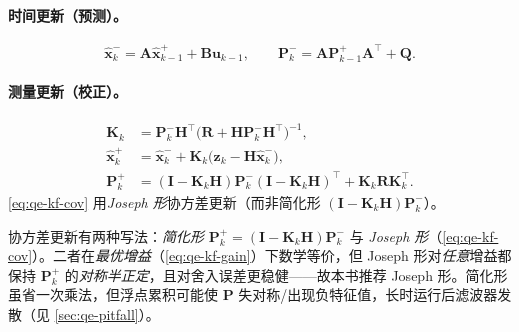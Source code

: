 \paragraph{时间更新（预测）。}
\begin{equation}
  \hat{\boldsymbol x}_k^- = \mathbf{A}\hat{\boldsymbol x}_{k-1}^+ + \mathbf{B}\boldsymbol u_{k-1},
  \qquad
  \mathbf{P}_k^- = \mathbf{A}\mathbf{P}_{k-1}^+\mathbf{A}^\top + \mathbf{Q}.
  \label{eq:qe-kf-predict}
\end{equation}

\paragraph{测量更新（校正）。}
\begin{align}
  \mathbf{K}_k &= \mathbf{P}_k^-\mathbf{H}^\top\big(\mathbf{R} + \mathbf{H}\mathbf{P}_k^-\mathbf{H}^\top\big)^{-1},
  \label{eq:qe-kf-gain}\\
  \hat{\boldsymbol x}_k^+ &= \hat{\boldsymbol x}_k^- + \mathbf{K}_k\big(\boldsymbol z_k - \mathbf{H}\hat{\boldsymbol x}_k^-\big),
  \label{eq:qe-kf-update}\\
  \mathbf{P}_k^+ &= (\mathbf{I} - \mathbf{K}_k\mathbf{H})\mathbf{P}_k^-(\mathbf{I} - \mathbf{K}_k\mathbf{H})^\top + \mathbf{K}_k\mathbf{R}\mathbf{K}_k^\top.
  \label{eq:qe-kf-cov}
\end{align}
\cref{eq:qe-kf-cov} 用\emph{Joseph 形}协方差更新（而非简化形 $(\mathbf{I}-\mathbf{K}_k\mathbf{H})\mathbf{P}_k^-$）。

\begin{note}\label{note:qe-joseph}
协方差更新有两种写法：\emph{简化形} $\mathbf{P}_k^+=(\mathbf{I}-\mathbf{K}_k\mathbf{H})\mathbf{P}_k^-$ 与 \emph{Joseph 形}（\cref{eq:qe-kf-cov}）。二者在\emph{最优增益}（\cref{eq:qe-kf-gain}）下数学等价，但 Joseph 形对\emph{任意}增益都保持 $\mathbf{P}_k^+$ 的\emph{对称半正定}，且对舍入误差更稳健——故本书推荐 Joseph 形。简化形虽省一次乘法，但浮点累积可能使 $\mathbf{P}$ 失对称/出现负特征值，长时运行后滤波器发散（见 \cref{sec:qe-pitfall}）。
\end{note}

